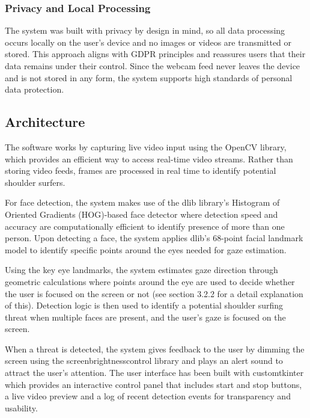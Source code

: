 \documentclass[12pt]{article}
\theoremstyle{plain}
\theoremstyle{definition}
\begin{document}
\subsubsection{Privacy and Local Processing}
\label{privacy}

The system was built with privacy by design in mind, so all data processing occurs locally on the user’s device and no images or videos are transmitted or stored. This approach aligns with GDPR principles and reassures users that their data remains under their control. Since the webcam feed never leaves the device and is not stored in any form, the system supports high standards of personal data protection.

\subsection{Architecture}
\label{Architecture}

The software works by capturing live video input using the OpenCV library, which provides an efficient way to access real-time video streams. Rather than storing video feeds, frames are processed in real time to identify potential shoulder surfers.

For face detection, the system makes use of the dlib library’s Histogram of Oriented Gradients (HOG)-based face detector \cite{noauthor_dlib_nodate} where detection speed and accuracy are computationally efficient to identify presence of more than one person. Upon detecting a face, the system applies dlib’s 68-point facial landmark model to identify specific points around the eyes needed for gaze estimation. 

Using the key eye landmarks, the system estimates gaze direction through geometric calculations where points around the eye are used to decide whether the user is focused on the screen or not (see section 3.2.2 for a detail explanation of this). Detection logic is then used to identify a potential shoulder surfing threat when multiple faces are present, and the user’s gaze is focused on the screen.

When a threat is detected, the system gives feedback to the user by dimming the screen using the screen\textunderscore brightness\textunderscore control library and plays an alert sound to attract the user’s attention. The user interface has been built with customtkinter which provides an interactive control panel that includes start and stop buttons, a live video preview and a log of recent detection events for transparency and usability. 
\end{document}

